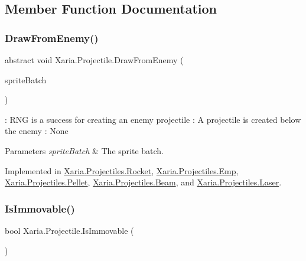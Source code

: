 \subsection{Member Function Documentation}
\mbox{\label{classXaria_1_1Projectile_a92b00c404863fc5ef875fb598345bcbc}} 
\subsubsection{\texorpdfstring{Draw\+From\+Enemy()}{DrawFromEnemy()}}
{\footnotesize\ttfamily abstract void Xaria.\+Projectile.\+Draw\+From\+Enemy (\begin{DoxyParamCaption}\item[{ref Sprite\+Batch}]{sprite\+Batch }\end{DoxyParamCaption})\hspace{0.3cm}{\ttfamily [pure virtual]}}



\+: R\+NG is a success for creating an enemy projectile \+: A projectile is created below the enemy \+: None 


\begin{DoxyParams}{Parameters}
{\em sprite\+Batch} & The sprite batch.\\
\hline
\end{DoxyParams}


Implemented in \hyperlink{classXaria_1_1Projectiles_1_1Rocket_ab58c907729bbf1a6f0589ce8e3de469f}{Xaria.\+Projectiles.\+Rocket}, \hyperlink{classXaria_1_1Projectiles_1_1Emp_a9eded776a417679715918b35bfcba6d7}{Xaria.\+Projectiles.\+Emp}, \hyperlink{classXaria_1_1Projectiles_1_1Pellet_a86ecd20381a12b3289203145687f27e8}{Xaria.\+Projectiles.\+Pellet}, \hyperlink{classXaria_1_1Projectiles_1_1Beam_ad7d3c0609b54569416d7be95980d2c3e}{Xaria.\+Projectiles.\+Beam}, and \hyperlink{classXaria_1_1Projectiles_1_1Laser_a8ce585ff80044654b9c697c30cb9b1c2}{Xaria.\+Projectiles.\+Laser}.

\mbox{\label{classXaria_1_1Projectile_a00177398f98fba5aad8e9b4a0cb02e0c}} 
\subsubsection{\texorpdfstring{Is\+Immovable()}{IsImmovable()}}
{\footnotesize\ttfamily bool Xaria.\+Projectile.\+Is\+Immovable (\begin{DoxyParamCaption}{ }\end{DoxyParamCaption})\hspace{0.3cm}{\ttfamily [inline]}}



